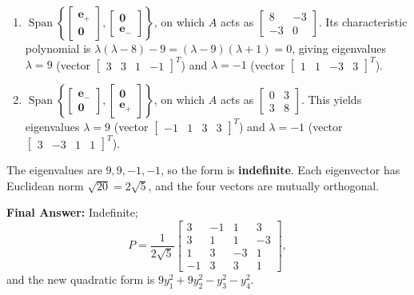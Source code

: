 \documentclass[11pt, letterpaper]{article}
\theoremstyle{definition}
\theoremstyle{remark}
\begin{document}
\begin{enumerate}
    \item $\operatorname{Span}\left\{\begin{bmatrix} \mathbf{e}_+ \\ \mathbf{0} \end{bmatrix}, \begin{bmatrix} \mathbf{0} \\ \mathbf{e}_- \end{bmatrix}\right\}$, on which $A$ acts as $\begin{bmatrix} 8 & -3 \\ -3 & 0 \end{bmatrix}$. Its characteristic polynomial is $\lambda(\lambda - 8) - 9 = (\lambda - 9)(\lambda + 1) = 0$, giving eigenvalues $\lambda = 9$ (vector $\begin{bmatrix} 3 & 3 & 1 & -1 \end{bmatrix}^T$) and $\lambda = -1$ (vector $\begin{bmatrix} 1 & 1 & -3 & 3 \end{bmatrix}^T$).
    \item $\operatorname{Span}\left\{\begin{bmatrix} \mathbf{e}_- \\ \mathbf{0} \end{bmatrix}, \begin{bmatrix} \mathbf{0} \\ \mathbf{e}_+ \end{bmatrix}\right\}$, on which $A$ acts as $\begin{bmatrix} 0 & 3 \\ 3 & 8 \end{bmatrix}$. This yields eigenvalues $\lambda = 9$ (vector $\begin{bmatrix} -1 & 1 & 3 & 3 \end{bmatrix}^T$) and $\lambda = -1$ (vector $\begin{bmatrix} 3 & -3 & 1 & 1 \end{bmatrix}^T$).
\end{enumerate}
The eigenvalues are $9, 9, -1, -1$, so the form is \textbf{indefinite}. Each eigenvector has Euclidean norm $\sqrt{20} = 2\sqrt{5}$, and the four vectors are mutually orthogonal.

\textbf{Final Answer:} Indefinite;
\[
P = \frac{1}{2\sqrt{5}}\begin{bmatrix}
3 & -1 & 1 & 3 \\
3 & 1 & 1 & -3 \\
1 & 3 & -3 & 1 \\
-1 & 3 & 3 & 1
\end{bmatrix},
\]
and the new quadratic form is $9y_1^2 + 9y_2^2 - y_3^2 - y_4^2$.
\end{document}
